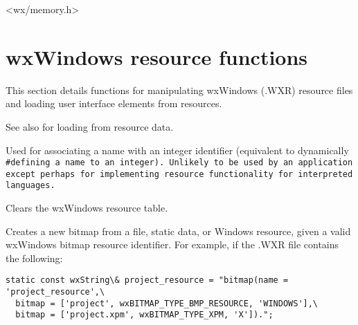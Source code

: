 <wx/memory.h>

\section{wxWindows resource functions}\label{resourcefuncs}


This section details functions for manipulating wxWindows (.WXR) resource
files and loading user interface elements from resources.



See also  for
loading from resource data.

\label{wxresourceaddidentifier}


Used for associating a name with an integer identifier (equivalent to dynamically\rtfsp
\tt{#}defining a name to an integer). Unlikely to be used by an application except
perhaps for implementing resource functionality for interpreted languages.



Clears the wxWindows resource table.



Creates a new bitmap from a file, static data, or Windows resource, given a valid
wxWindows bitmap resource identifier. For example, if the .WXR file contains
the following:

\begin{verbatim}
static const wxString\& project_resource = "bitmap(name = 'project_resource',\
  bitmap = ['project', wxBITMAP_TYPE_BMP_RESOURCE, 'WINDOWS'],\
  bitmap = ['project.xpm', wxBITMAP_TYPE_XPM, 'X']).";
\end{verbatim}

